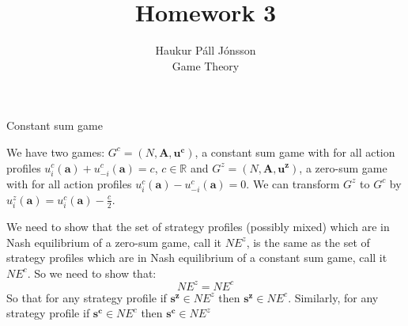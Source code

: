 \documentclass[12pt]{article}
\newcommand{\R}{\mathbb{R}}
\newenvironment{question}[2][Question]{\begin{trivlist}
\item[\hskip \labelsep {\bfseries #1}\hskip \labelsep {\bfseries #2.}]}{\end{trivlist}}
\newenvironment{answer}[2][Answer]{\begin{trivlist}
\item[\hskip \labelsep {\bfseries #1}\hskip \labelsep {\bfseries #2:}]}{\end{trivlist}}
\begin{document}
\let\oldsum\sum
\renewcommand{\sum}[3]{\oldsum\limits_{#1}^{#2}#3}
\let\oldprod\prod
\renewcommand{\prod}[3]{\oldprod\limits_{#1}^{#2}#3}

\title{Homework 3}
\author{Haukur Páll Jónsson\\
Game Theory}

\maketitle

\begin{question}{1}
Constant sum game
\end{question}
\begin{answer}{a)}
We have two games: $G^c=(N,\boldsymbol{A}, \boldsymbol{u^c})$, a constant sum game with for all action profiles $u_i^c(\boldsymbol{a}) + u_{-i}^c(\boldsymbol{a})=c$, $c\in \R$ and $G^z=(N,\boldsymbol{A}, \boldsymbol{u^z})$, a zero-sum game with for all action profiles $u_i^c(\boldsymbol{a}) -u_{-i}^c(\boldsymbol{a})=0$. We can transform $G^z$ to $G^c$ by $u_i^z(\boldsymbol{a})=u_i^c(\boldsymbol{a}) - \frac{c}{2}$.

We need to show that the set of strategy profiles (possibly mixed) which are in Nash equilibrium of a zero-sum game, call it $NE^z$, is the same as the set of strategy profiles which are in Nash equilibrium of a constant sum game, call it $NE^c$. So we need to show that:
$$NE^z=NE^c$$
So that for any strategy profile if $\boldsymbol{s^z} \in NE^z$ then $\boldsymbol{s^z} \in NE^c$. Similarly, for any strategy profile if $\boldsymbol{s^c} \in NE^c$ then $\boldsymbol{s^c} \in NE^z$


\end{answer}
\end{document}
